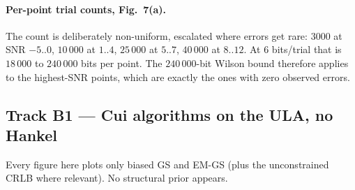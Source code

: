 \documentclass[11pt,a4paper]{article}
\begin{document}
\paragraph{Per-point trial counts, Fig.~7(a).} The count is deliberately
non-uniform, escalated where errors get rare: $3000$ at SNR $-5..0$, $10\,000$
at $1..4$, $25\,000$ at $5..7$, $40\,000$ at $8..12$. At $6$ bits/trial that
is $18\,000$ to $240\,000$ bits per point. The $240\,000$-bit Wilson bound
therefore applies to the highest-SNR points, which are exactly the ones with
zero observed errors.

\subsection{Track B1 --- Cui algorithms on the ULA, no Hankel}

Every figure here plots only biased GS and EM-GS (plus the unconstrained CRLB
where relevant). No structural prior appears.
\end{document}
